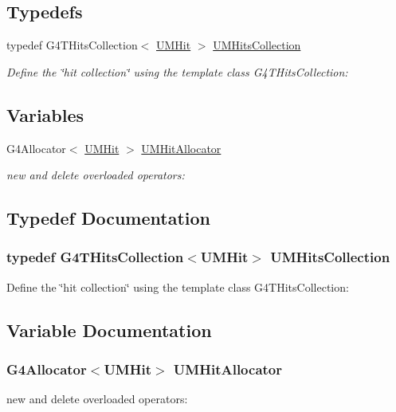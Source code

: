 \subsection*{Typedefs}
\begin{DoxyCompactItemize}
\item 
typedef G4\+T\+Hits\+Collection$<$ \hyperlink{classUMHit}{U\+M\+Hit} $>$ \hyperlink{UMHit_8hh_ae4ae3db383f3d522b08825b4ecbfc3e6}{U\+M\+Hits\+Collection}
\begin{DoxyCompactList}\small\item\em Define the \char`\"{}hit collection\char`\"{} using the template class G4\+T\+Hits\+Collection\+: \end{DoxyCompactList}\end{DoxyCompactItemize}
\subsection*{Variables}
\begin{DoxyCompactItemize}
\item 
G4\+Allocator$<$ \hyperlink{classUMHit}{U\+M\+Hit} $>$ \hyperlink{UMHit_8hh_a9d8361bd2d8e805dd16550d0d0808c57}{U\+M\+Hit\+Allocator}
\begin{DoxyCompactList}\small\item\em new and delete overloaded operators\+: \end{DoxyCompactList}\end{DoxyCompactItemize}


\subsection{Typedef Documentation}
\hypertarget{UMHit_8hh_ae4ae3db383f3d522b08825b4ecbfc3e6}{}
\subsubsection[{U\+M\+Hits\+Collection}]{\setlength{\rightskip}{0pt plus 5cm}typedef G4\+T\+Hits\+Collection$<${\bf U\+M\+Hit}$>$ {\bf U\+M\+Hits\+Collection}}\label{UMHit_8hh_ae4ae3db383f3d522b08825b4ecbfc3e6}


Define the \char`\"{}hit collection\char`\"{} using the template class G4\+T\+Hits\+Collection\+: 



\subsection{Variable Documentation}
\hypertarget{UMHit_8hh_a9d8361bd2d8e805dd16550d0d0808c57}{}
\subsubsection[{U\+M\+Hit\+Allocator}]{\setlength{\rightskip}{0pt plus 5cm}G4\+Allocator$<${\bf U\+M\+Hit}$>$ U\+M\+Hit\+Allocator}\label{UMHit_8hh_a9d8361bd2d8e805dd16550d0d0808c57}


new and delete overloaded operators\+: 


